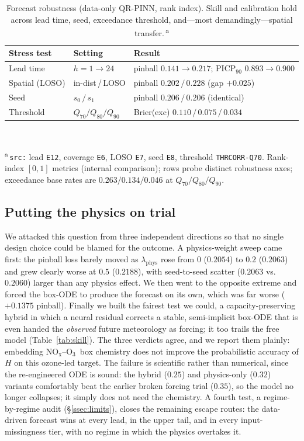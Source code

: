 \documentclass[conference]{IEEEtran}
\newcommand{\nox}{\ensuremath{\mathrm{NO_x}}}
\newcommand{\othree}{\ensuremath{\mathrm{O_3}}}
\begin{document}
\begin{table}[t]
\caption{Forecast robustness (data-only QR-PINN, rank index). Skill and calibration hold across lead
time, seed, exceedance threshold, and---most demandingly---spatial transfer.\,\textsuperscript{a}}
\label{tab:robust}
\centering\footnotesize
\renewcommand{\arraystretch}{1.08}
\begin{tabular}{@{}p{}p{}p{}@{}}
\toprule
\textbf{Stress test} & \textbf{Setting} & \textbf{Result}\\
\midrule
Lead time & $h{=}1\!\rightarrow\!24$ & pinball $0.141\!\rightarrow\!0.217$; PICP$_{90}$ $0.893\!\rightarrow\!0.900$\\
Spatial (LOSO) & in-dist\,/\,LOSO & pinball $0.202\,/\,0.228$ (gap $+0.025$)\\
Seed & $s_0\,/\,s_1$ & pinball $0.206\,/\,0.206$ (identical)\\
Threshold & $Q_{70}/Q_{80}/Q_{90}$ & Brier(exc) $0.110\,/\,0.075\,/\,0.034$\\
\bottomrule
\end{tabular}
\\[2pt]
\raggedright\textsuperscript{a}\,\texttt{src:} lead \texttt{E12}, coverage \texttt{E6}, LOSO \texttt{E7},
seed \texttt{E8}, threshold \texttt{THRCORR-Q70}. Rank-index $[0,1]$ metrics (internal comparison); rows
probe distinct robustness axes; exceedance base rates are $0.263/0.134/0.046$ at $Q_{70}/Q_{80}/Q_{90}$.
\end{table}

\subsection{Putting the physics on trial}\label{ssec:phys}
We attacked this question from three independent directions so that no single design choice could be
blamed for the outcome. A physics-weight sweep came first: the
pinball loss barely moved as $\lambda_{\mathrm{phys}}$ rose from $0$ ($0.2054$) to $0.2$ ($0.2063$) and
grew clearly worse at $0.5$ ($0.2188$), with seed-to-seed scatter ($0.2063$ vs.\ $0.2060$) larger than
any physics effect. We then went to the opposite extreme and forced the box-ODE to produce the forecast
on its own, which was far worse ($+0.1375$ pinball). Finally we built the fairest test we could, a
capacity-preserving hybrid in which a neural residual corrects a stable, semi-implicit box-ODE that is
even handed the \emph{observed} future meteorology as forcing; it too trails the free model
(Table~\ref{tab:skill}). The three verdicts agree, and we report them plainly: embedding \nox--\othree\
box chemistry does not improve the probabilistic accuracy of $H$ on this ozone-led target. The failure
is scientific rather than numerical, since the re-engineered ODE is sound: the hybrid ($0.25$) and
physics-only ($0.32$) variants comfortably beat the earlier broken forcing trial ($0.35$), so the model
no longer collapses; it simply does not need the chemistry. A fourth test, a regime-by-regime audit
(\S\ref{ssec:limits}), closes the remaining escape routes: the data-driven forecast wins at every lead,
in the upper tail, and in every input-missingness tier, with no regime in which the physics overtakes it.
\end{document}
